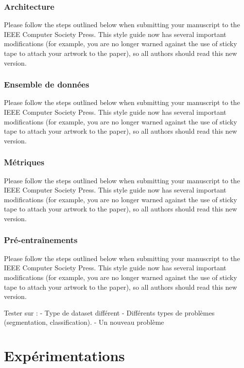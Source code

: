 \documentclass[10pt,twocolumn,letterpaper,french]{article}
\begin{document}
\subsubsection*{Architecture}

Please follow the steps outlined below when submitting your manuscript to
the IEEE Computer Society Press.  This style guide now has several
important modifications (for example, you are no longer warned against the
use of sticky tape to attach your artwork to the paper), so all authors
should read this new version.

\subsubsection*{Ensemble de données}


Please follow the steps outlined below when submitting your manuscript to
the IEEE Computer Society Press.  This style guide now has several
important modifications (for example, you are no longer warned against the
use of sticky tape to attach your artwork to the paper), so all authors
should read this new version.

\subsubsection*{Métriques}

Please follow the steps outlined below when submitting your manuscript to
the IEEE Computer Society Press.  This style guide now has several
important modifications (for example, you are no longer warned against the
use of sticky tape to attach your artwork to the paper), so all authors
should read this new version.

\subsubsection*{Pré-entraînements}

Please follow the steps outlined below when submitting your manuscript to
the IEEE Computer Society Press.  This style guide now has several
important modifications (for example, you are no longer warned against the
use of sticky tape to attach your artwork to the paper), so all authors
should read this new version.

Tester sur : 
	- Type de dataset différent
	- Différents types de problèmes (segmentation, classification).
	- Un nouveau problème

\section*{Expérimentations}
\end{document}
